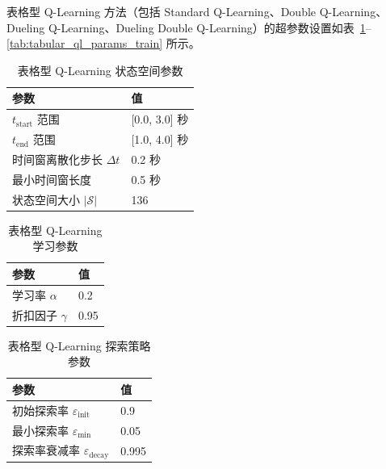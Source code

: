 \label{sec:hyperparameters}

\label{subsec:tabular_ql_params}

表格型 Q-Learning 方法（包括 Standard Q-Learning、Double Q-Learning、Dueling Q-Learning、Dueling Double Q-Learning）的超参数设置如表~\ref{tab:tabular_ql_params_state}--\ref{tab:tabular_ql_params_train} 所示。

\begin{table}[H]
\centering
\caption{表格型 Q-Learning 状态空间参数}
\label{tab:tabular_ql_params_state}
\begin{tabular}{ll}
\hline
\textbf{参数} & \textbf{值} \\
\hline
$t_{\text{start}}$ 范围 & [0.0, 3.0] 秒 \\
$t_{\text{end}}$ 范围 & [1.0, 4.0] 秒 \\
时间窗离散化步长 $\Delta t$ & 0.2 秒 \\
最小时间窗长度 & 0.5 秒 \\
状态空间大小 $|\mathcal{S}|$ & 136 \\
\hline
\end{tabular}
\end{table}

\begin{table}[H]
\centering
\caption{表格型 Q-Learning 学习参数}
\label{tab:tabular_ql_params_learn}
\begin{tabular}{ll}
\hline
\textbf{参数} & \textbf{值} \\
\hline
学习率 $\alpha$ & 0.2 \\
折扣因子 $\gamma$ & 0.95 \\
\hline
\end{tabular}
\end{table}

\begin{table}[H]
\centering
\caption{表格型 Q-Learning 探索策略参数}
\label{tab:tabular_ql_params_explore}
\begin{tabular}{ll}
\hline
\textbf{参数} & \textbf{值} \\
\hline
初始探索率 $\varepsilon_{\text{init}}$ & 0.9 \\
最小探索率 $\varepsilon_{\text{min}}$ & 0.05 \\
探索率衰减率 $\varepsilon_{\text{decay}}$ & 0.995 \\
\hline
\end{tabular}
\end{table}

